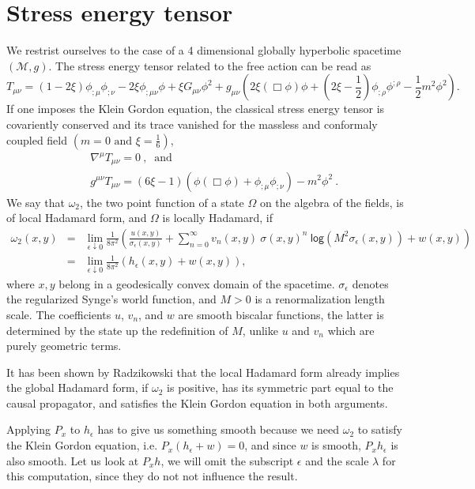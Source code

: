 \documentclass[10pt]{book}
\theoremstyle{break}
\begin{document}
\section{Stress energy tensor}


We restrist ourselves to the case of a 4 dimensional globally hyperbolic spacetime $(\mathcal{M},g)$. The stress energy tensor related to the free action can be read as%
%
\begin{equation*}
T_{\mu\nu} = \left(1-2\xi\right) \phi_{;\mu} \phi_{;\nu} - 2 \xi \phi_{;\mu\nu} \phi + \xi G_{\mu\nu} \phi^2 + g_{\mu\nu} \left( 2\xi\left(\Box\phi\right) \phi + \left(2\xi-\frac12\right) \phi_{;\rho} \phi^{;\rho} - \frac12 m^2 \phi^2 \right) .
\end{equation*}
%
If one imposes the Klein Gordon equation, the classical stress energy tensor is covariently conserved and its trace vanished for the massless and conformaly coupled field $\left(m=0 \mbox{ and } \xi=\frac16\right)$, %
%
\begin{eqnarray*}
&& \nabla^\mu T_{\mu\nu} = 0 \ , \ \mbox{ and } \\
&& g^{\mu\nu} T_{\mu\nu} = \left(6\xi-1\right) \left(\phi\left(\Box\phi\right) + \phi_{;\mu} \phi_{;\nu} \right) - m^2 \phi^2 \ .
\end{eqnarray*}
%
We say that $\omega_2$, the two point function of a state $\Omega$ on the algebra of the fields, is of local Hadamard form, and $\Omega$ is locally Hadamard, if%
%
\begin{eqnarray*}
\omega_2(x,y) &=& \lim_{\epsilon \downarrow 0} \frac{1}{8\pi^2} \left( \frac{u(x,y)}{\sigma_\epsilon(x,y)} + \sum_{n=0}^\infty v_n(x,y) \ \sigma(x,y)^n \ \mathsf{log}\left(M^2 \sigma_\epsilon(x,y)\right) + w(x,y) \right) \\
&=& \lim_{\epsilon \downarrow 0} \frac{1}{8\pi^2} \left( h_\epsilon(x,y) + w(x,y) \right) ,
\end{eqnarray*}
%
where $x, y$ belong in a geodesically convex domain of the spacetime. $\sigma_\epsilon$ denotes the regularized Synge's world function, and $M > 0$ is a renormalization length scale. The coefficients $u$, $v_n$, and $w$ are smooth biscalar functions, the latter is determined by the state up the redefinition of $M$, unlike $u$ and $v_n$ which are purely geometric terms.\par%
%
It has been shown by Radzikowski that the local Hadamard form already implies the global Hadamard form, if $\omega_2$ is positive, has its symmetric part equal to the causal propagator, and satisfies the Klein Gordon equation in both arguments.\par%
%
Applying $P_x$ to $h_\epsilon$ has to give us something smooth because we need $\omega_2$ to satisfy the Klein Gordon equation, i.e. $P_x\left(h_\epsilon+w\right) = 0$, and since $w$ is smooth, $P_xh_\epsilon$ is also smooth. Let us look at $P_x h$, we will omit the subscript $\epsilon$ and the scale $\lambda$ for this computation, since they do not not influence the result.%
%
\end{document}
